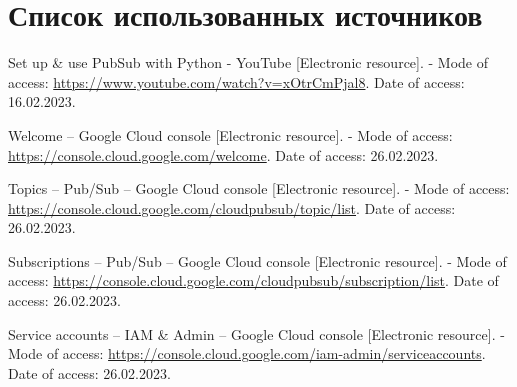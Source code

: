 \documentclass[12pt, a4paper, simple]{eskdtext}
\begin{document}
    \section*{Список использованных источников} %

    \renewcommand{\addcontentsline}[3]{}%
    \renewcommand{\section}[2]{}%

    \begin{thebibliography}{}

    Set up \& use PubSub with Python - YouTube
    [Electronic resource]. -
    Mode of access:
    \url{https://www.youtube.com/watch?v=xOtrCmPjal8}.
    Date of access: 16.02.2023.

    Welcome – Google Cloud console
    [Electronic resource]. -
    Mode of access:
    \url{https://console.cloud.google.com/welcome}.
    Date of access: 26.02.2023.

    Topics – Pub/Sub – Google Cloud console
    [Electronic resource]. -
    Mode of access:
    \url{https://console.cloud.google.com/cloudpubsub/topic/list}.
    Date of access: 26.02.2023.

    Subscriptions – Pub/Sub – Google Cloud console
    [Electronic resource]. -
    Mode of access:
    \url{https://console.cloud.google.com/cloudpubsub/subscription/list}.
    Date of access: 26.02.2023.

    Service accounts – IAM \& Admin – Google Cloud console
    [Electronic resource]. -
    Mode of access:
    \url{https://console.cloud.google.com/iam-admin/serviceaccounts}.
    Date of access: 26.02.2023.

  \end{thebibliography}
  \endgroup
\end{document}
